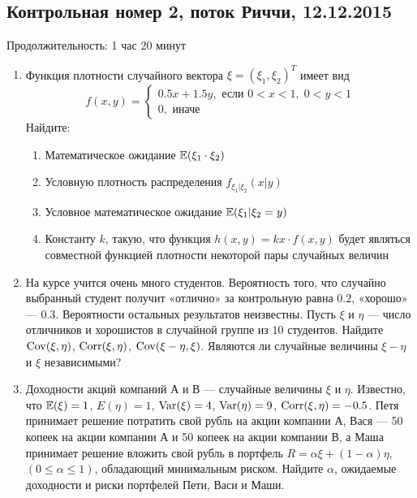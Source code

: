\documentclass[12pt, a4paper]{article}\usepackage[]{graphicx}\usepackage[]{color}
\begin{document}
\subsection{Контрольная номер 2, поток Риччи, 12.12.2015}

Продолжительность: 1 час 20 минут


\begin{enumerate}
\item Функция плотности случайного вектора $\xi=(\xi_1, \xi_2)^T$ имеет вид
\[
f(x,y)=\begin{cases}
0.5x + 1.5y, \text{ если } 0<x<1, \; 0<y<1 \\
0, \text{ иначе }
\end{cases}
\]
Найдите:
\begin{enumerate}
\item Математическое ожидание $\mathbb{E}(\xi_1 \cdot \xi_2)$
\item Условную плотность распределения $f_{\xi_1|\xi_2} (x|y)$
\item Условное математическое ожидание $\mathbb{E}(\xi_1| \xi_2=y)$
\item Константу $k$, такую, что функция $h(x,y)=kx\cdot f(x,y)$ будет являться совместной функцией плотности некоторой пары случайных величин
\end{enumerate}

\item На курсе учится очень много студентов. Вероятность того, что случайно выбранный студент получит «отлично» за контрольную равна $0.2$, «хорошо» — $0.3$. Вероятности остальных результатов неизвестны. Пусть $\xi$ и $\eta$ — число отличников и хорошистов в случайной группе из $10$ студентов. Найдите $\operatorname{Cov}(\xi,\eta)$, $\operatorname{Corr}(\xi,\eta)$, $\operatorname{Cov}(\xi-\eta,\xi)$. Являются ли случайные величины $\xi-\eta$ и $\xi$ независимыми?

\item Доходности акций компаний А и В — случайные величины $\xi$ и $\eta$. Известно, что $\mathbb{E}(\xi)=1$, $E(\eta)=1$, $\operatorname{Var}(\xi)=4$, $\operatorname{Var}(\eta)=9$, $\operatorname{Corr}(\xi,\eta)=-0.5$. Петя принимает решение потратить свой рубль на акции компании А, Вася — 50 копеек на акции компании А и 50 копеек на акции компании В, а Маша  принимает решение вложить свой рубль в портфель $R=\alpha\xi+(1-\alpha)\eta$, $(0 \leq \alpha \leq 1)$, обладающий минимальным риском. Найдите $\alpha$, ожидаемые доходности и риски портфелей Пети, Васи и Маши.


\end{enumerate}
\end{document}
